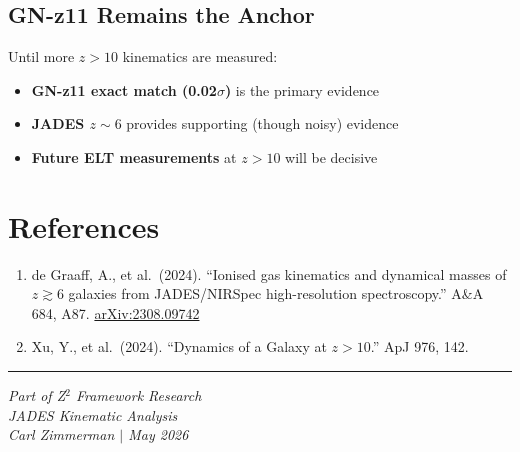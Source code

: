 \documentclass[12pt,a4paper]{article}
\begin{document}
\subsection{GN-z11 Remains the Anchor}

Until more $z > 10$ kinematics are measured:
\begin{itemize}
\item \textbf{GN-z11 exact match (0.02$\sigma$)} is the primary evidence
\item \textbf{JADES $z \sim 6$} provides supporting (though noisy) evidence
\item \textbf{Future ELT measurements} at $z > 10$ will be decisive
\end{itemize}

\section{References}

\begin{enumerate}
\item de Graaff, A., et al.\ (2024). ``Ionised gas kinematics and dynamical masses of $z \gtrsim 6$ galaxies from JADES/NIRSpec high-resolution spectroscopy.'' A\&A 684, A87. \href{https://arxiv.org/abs/2308.09742}{arXiv:2308.09742}

\item Xu, Y., et al.\ (2024). ``Dynamics of a Galaxy at $z > 10$.'' ApJ 976, 142.
\end{enumerate}

\vspace{1cm}
\hrule
\vspace{0.5cm}
\textit{Part of Z$^2$ Framework Research}\\
\textit{JADES Kinematic Analysis}\\
\textit{Carl Zimmerman $|$ May 2026}
\end{document}
